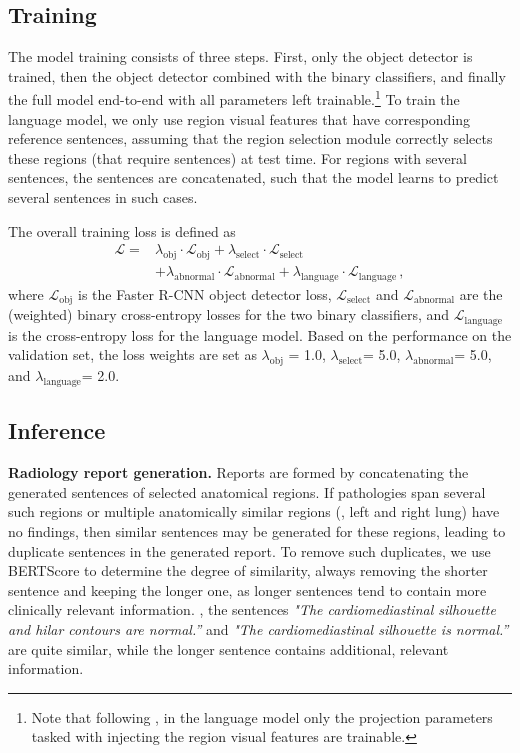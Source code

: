 \documentclass[10pt,twocolumn,letterpaper]{article}
\begin{document}
\subsection{Training}

The model training consists of three steps. First, only the object detector is trained, then the object detector combined with the binary classifiers, and finally the full model end-to-end with all parameters left trainable.\footnote{Note that following \cite{ziegler2019encoder}, in the language model only the projection parameters tasked with injecting the region visual features are trainable.} To train the language model, we only use region visual features that have corresponding reference sentences, assuming that the region selection module correctly selects these regions (that require sentences) at test time. For regions with several sentences, the sentences are concatenated, such that the model learns to predict several sentences in such cases.

The overall training loss is defined as
\begin{equation}
\begin{aligned}
\mathcal{L} = {} & \lambda_{\text{obj}} \cdot \mathcal{L}_{\text{obj}} + \lambda_{\text{select}}\cdot\mathcal{L}_{\text{select}} \\
&+ \lambda_{\text{abnormal}}\cdot\mathcal{L}_{\text{abnormal}} + \lambda_{\text{language}}\cdot\mathcal{L}_{\text{language}} \,,
  \label{eq:loss-function}
\end{aligned}
\end{equation}
where $\mathcal{L}_{\text{obj}}$ is the Faster R-CNN object detector loss, $\mathcal{L}_{\text{select}}$ and $\mathcal{L}_{\text{abnormal}}$ are the (weighted) binary cross-entropy losses for the two binary classifiers, and $\mathcal{L}_{\text{language}}$ is the cross-entropy loss for the language model. Based on the performance on the validation set, the loss weights are set as $\lambda_{\text{obj}}$ = 1.0, $\lambda_{\text{select}}$= 5.0, $\lambda_{\text{abnormal}}$= 5.0, and $\lambda_{\text{language}}$= 2.0.

\subsection{Inference}
\label{sec:inference}

\noindent\textbf{Radiology report generation.} Reports are formed by concatenating the generated sentences of selected anatomical regions. If pathologies span several such regions or multiple anatomically similar regions (\eg, left and right lung) have no findings, then similar sentences may be generated for these regions, leading to duplicate sentences in the generated report. To remove such duplicates, we use BERTScore \cite{zhang2019bertscore} to determine the degree of similarity, always removing the shorter sentence and keeping the longer one, as longer sentences tend to contain more clinically relevant information. \Eg, the sentences \emph{"The cardiomediastinal silhouette and hilar contours are normal.”} and \emph{"The cardiomediastinal silhouette is normal.”} are quite similar, while the longer sentence contains additional, relevant information.
\end{document}
